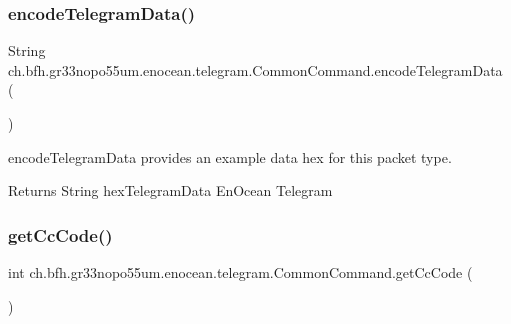 \hypertarget{classch_1_1bfh_1_1gr33nopo55um_1_1enocean_1_1telegram_1_1_common_command_aed721fbcd413ff06a6d6a6adbb9469e3}{}\label{classch_1_1bfh_1_1gr33nopo55um_1_1enocean_1_1telegram_1_1_common_command_aed721fbcd413ff06a6d6a6adbb9469e3} 
\subsubsection{\texorpdfstring{encode\+Telegram\+Data()}{encodeTelegramData()}}
{\footnotesize\ttfamily String ch.\+bfh.\+gr33nopo55um.\+enocean.\+telegram.\+Common\+Command.\+encode\+Telegram\+Data (\begin{DoxyParamCaption}{ }\end{DoxyParamCaption})}

encode\+Telegram\+Data provides an example data hex for this packet type.

\begin{DoxyReturn}{Returns}
String hex\+Telegram\+Data En\+Ocean Telegram 
\end{DoxyReturn}
\hypertarget{classch_1_1bfh_1_1gr33nopo55um_1_1enocean_1_1telegram_1_1_common_command_a656267002ccb682736cef899964644ea}{}\label{classch_1_1bfh_1_1gr33nopo55um_1_1enocean_1_1telegram_1_1_common_command_a656267002ccb682736cef899964644ea} 
\subsubsection{\texorpdfstring{get\+Cc\+Code()}{getCcCode()}}
{\footnotesize\ttfamily int ch.\+bfh.\+gr33nopo55um.\+enocean.\+telegram.\+Common\+Command.\+get\+Cc\+Code (\begin{DoxyParamCaption}{ }\end{DoxyParamCaption})}

\hypertarget{classch_1_1bfh_1_1gr33nopo55um_1_1enocean_1_1telegram_1_1_common_command_af8547a42a014cd605d89e17ae4c80ef4}{}\label{classch_1_1bfh_1_1gr33nopo55um_1_1enocean_1_1telegram_1_1_common_command_af8547a42a014cd605d89e17ae4c80ef4} 
